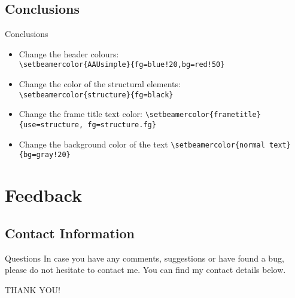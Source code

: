 \documentclass[10pt]{beamer}
\newcommand{\chref}[2]{%
  \href{#1}{{\usebeamercolor[bg]{AAUsimple}#2}}%
}
\begin{document}
\subsection{Conclusions}
\begin{frame}{Conclusions}{}
\begin{block}{}
   \begin{itemize}
        \item Change the header colours:\\
        {\tt \textbackslash setbeamercolor\{AAUsimple\}\{fg=blue!20,bg=red!50\}}
        \item Change the color of the structural elements:\\
        {\tt \textbackslash setbeamercolor\{structure\}\{fg=black\}}\\
        \item Change the frame title text color:
        {\tt \textbackslash setbeamercolor\{frametitle\}\{use=structure, fg=structure.fg\}}
        \item Change the background color of the text
        {\tt \textbackslash setbeamercolor\{normal text\}\{bg=gray!20\}}
      \end{itemize}
\end{block}
\end{frame}


\section{Feedback}

\subsection{Contact Information}
\begin{frame}{Questions}{}
In case you have any comments, suggestions or have found a bug, please do not hesitate to contact me. You can find my contact details below.
  \begin{center}
    {\LARGE THANK YOU!}
  \end{center}
\end{frame}
\end{document}

